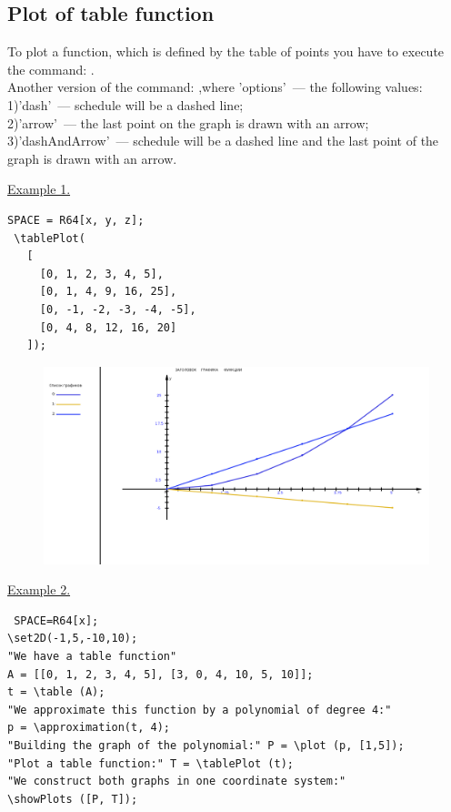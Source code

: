 \subsection{Plot of table function} 
To plot a function, which is defined by the table of points you have to execute the command: 
.\\
Another version of the command:
,where 'options'~--- the following values:\\
1)'dash'~--- schedule will be a dashed line;\\ 
2)'arrow'~---  the last point on the graph is drawn with an arrow;\\
3)'dashAndArrow'~--- schedule will be a dashed line and the last point of the graph is drawn with an arrow.

\underline{Example 1.}
 
 \vspace*{-2mm}

 \begin{verbatim}
SPACE = R64[x, y, z];
 \tablePlot(
   [
     [0, 1, 2, 3, 4, 5],
     [0, 1, 4, 9, 16, 25],
     [0, -1, -2, -3, -4, -5],
     [0, 4, 8, 12, 16, 20]
   ]);
 \end{verbatim}

\begin{figure}[!h]
 \includegraphics[scale=0.25]{pictures/2_7}
\vspace*{-10mm}
\caption{}
\label{2_7}
\end{figure}


\underline{Example 2.}

 \vspace*{-2mm}
 \begin{verbatim}
 SPACE=R64[x]; 
\set2D(-1,5,-10,10);
"We have a table function"
A = [[0, 1, 2, 3, 4, 5], [3, 0, 4, 10, 5, 10]];
t = \table (A);
"We approximate this function by a polynomial of degree 4:" 
p = \approximation(t, 4);
"Building the graph of the polynomial:" P = \plot (p, [1,5]);
"Plot a table function:" T = \tablePlot (t);
"We construct both graphs in one coordinate system:" 
\showPlots ([P, T]);
 \end{verbatim}

